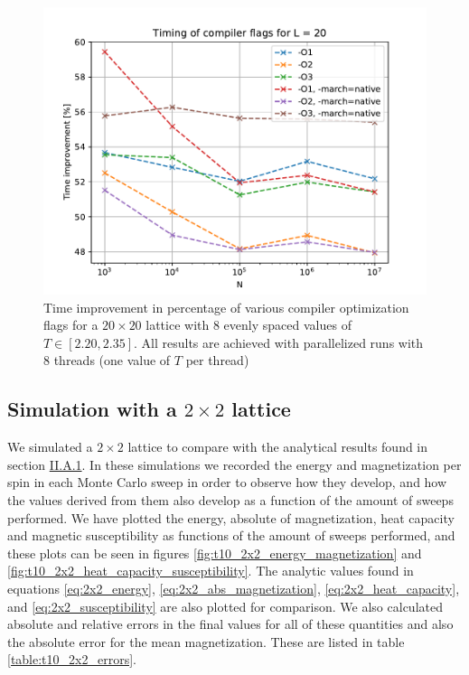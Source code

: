 \documentclass[reprint,english,notitlepage]{revtex4-1}  %
\begin{document}
\begin{figure}[H]
	\centering
	\includegraphics[width=\columnwidth]{../data/benchmark.pdf}
	\caption{Time improvement in percentage of various compiler optimization flags for a \(20\times 20\) lattice with \(8\) evenly spaced values of \(T \in [2.20, 2.35]\). All results are achieved with parallelized runs with \(8\) threads (one value of \(T\) per thread)} \label{fig:benchmark_compiler_flags}
\end{figure}



\subsection{Simulation with a $2\times 2$ lattice} \label{sec:IV:B}

We simulated a $2 \times 2$ lattice to compare with the analytical results found in section \hyperref[sec:II:A:i]{II.A.1}. In these simulations we recorded the energy and magnetization per spin in each Monte Carlo sweep in order to observe how they develop, and how the values derived from them also develop as a function of the amount of sweeps performed. We have plotted the energy, absolute of magnetization, heat capacity and magnetic susceptibility as functions of the amount of sweeps performed, and these plots can be seen in figures \ref{fig:t10_2x2_energy_magnetization} and \ref{fig:t10_2x2_heat_capacity_susceptibility}. The analytic values found in equations \eqref{eq:2x2_energy}, \eqref{eq:2x2_abs_magnetization}, \eqref{eq:2x2_heat_capacity}, and \eqref{eq:2x2_susceptibility} are also plotted for comparison. We also calculated absolute and relative errors in the final values for all of these quantities and also the absolute error for the mean magnetization. These are listed in table \ref{table:t10_2x2_errors}.
\end{document}
